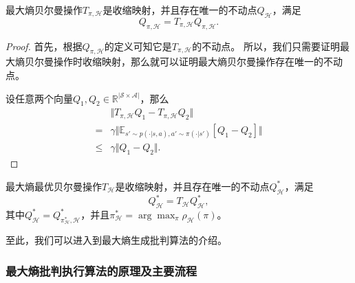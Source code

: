 \begin{theorem}[最大熵贝尔曼等式]
    最大熵贝尔曼操作$T_{\pi,\mathcal{H}}$是收缩映射，并且存在唯一的不动点$Q_{\mathcal{H}}$，满足
    \begin{equation}
        Q_{\pi,\mathcal{H}} = T_{\pi, \mathcal{H}} Q_{\pi,\mathcal{H}}.
    \end{equation}
\end{theorem}
\begin{proof}
    首先，根据$Q_{\pi,\mathcal{H}}$的定义可知它是$T_{\pi,\mathcal{H}}$的不动点。
    所以，我们只需要证明最大熵贝尔曼操作时收缩映射，那么就可以证明最大熵贝尔曼操作存在唯一的不动点。

    设任意两个向量$Q_1, Q_2\in \mathbb{R}^{\vert \mathcal{S} \times \mathcal{A} \vert}$，那么
    \begin{equation}
        \begin{aligned}
            &\Vert T_{\pi, \mathcal{H}} Q_1 - T_{\pi, \mathcal{H}} Q_2 \Vert \\
            =& \gamma \Vert \mathbb{E}_{s' \sim p(\cdot \vert s, a), a' \sim \pi(\cdot \vert s')} [Q_1 - Q_2] \Vert \\
            \le& \gamma \Vert Q_1 - Q_2 \Vert.
        \end{aligned}
    \end{equation}
\end{proof}

\begin{theorem}[最大熵最优贝尔曼等式]
    最大熵最优贝尔曼操作$T_{\mathcal{H}}$是收缩映射，并且存在唯一的不动点$Q^*_{\mathcal{H}}$，满足
    \begin{equation}
        Q^*_{\mathcal{H}} = T_{\mathcal{H}} Q^*_{\mathcal{H}},
    \end{equation}
    其中$Q^*_{\mathcal{H}} = Q^*_{\pi^*_{\mathcal{H}}, \mathcal{H}}$，并且$\pi^*_{\mathcal{H}} = \arg\max_{\pi} \rho_{\mathcal{H}}(\pi)$。
\end{theorem}

至此，我们可以进入到最大熵生成批判算法的介绍。

\subsubsection{最大熵批判执行算法的原理及主要流程}

